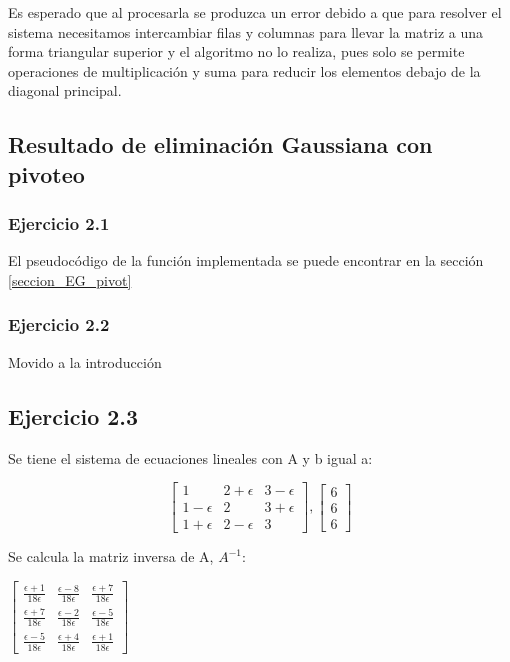     Es esperado que al procesarla se produzca un error debido a que para resolver el sistema necesitamos intercambiar filas y columnas para llevar la matriz a una forma triangular superior y el algoritmo no lo realiza, pues solo se permite operaciones de multiplicación y suma para reducir los elementos debajo de la diagonal principal.

    \subsection{Resultado de eliminación Gaussiana con pivoteo}
    \label{resultados EG c/p}
    \subsubsection{Ejercicio 2.1}
    El pseudocódigo de la función implementada se puede encontrar en la sección \ref{seccion_EG_pivot}

    \subsubsection{Ejercicio 2.2}

Movido a la introducción

\fi




\iffalse
    \subsection{Ejercicio 2.3}

    Se tiene el sistema de ecuaciones lineales con A y b igual a:

    \[ \begin{bmatrix}  
    1 & 2+\epsilon & 3-\epsilon\\
    1-\epsilon & 2 & 3+\epsilon\\
    1+\epsilon & 2-\epsilon & 3
    \end{bmatrix} ,
    \begin{bmatrix}
    6\\
    6\\
    6
    \end{bmatrix}\]
    
    Se calcula la matriz inversa de A, $A^{-1}$:    
    \begin{center}
    $\begin{bmatrix}
    \frac{\epsilon+1}{18\epsilon} & \frac{\epsilon-8}{18\epsilon} & \frac{\epsilon+7}{18\epsilon}\\
    \frac{\epsilon+7}{18\epsilon} & \frac{\epsilon-2}{18\epsilon} & \frac{\epsilon-5}{18\epsilon}\\
    \frac{\epsilon-5}{18\epsilon} & \frac{\epsilon+4}{18\epsilon} & \frac{\epsilon+1}{18\epsilon}
    \end{bmatrix}$
    \end{center}

